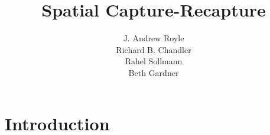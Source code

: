 \documentclass{book}
\begin{document}
\title{ Spatial Capture-Recapture  }
\subtitle{
}
\author{J. Andrew Royle \\
Richard B. Chandler \\
Rahel Sollmann \\
Beth Gardner}


\address{
USGS Patuxent Wildlife Research Center \\
North Carolina State University
}

\maketitle

\newpage

\setcounter{tocdepth}{2}
\tableofcontents

\chapter{Introduction}
\label{chapt.intro}


%












%







%


%
\end{document}
